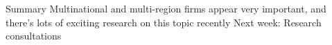 \documentclass[11pt,notes=hide,aspectratio=169]{beamer}
\begin{document}
\begin{frame}{Summary}
Multinational and multi-region firms appear very important, and there's lots of exciting research on this topic recently
\vspace{2cm}
Next week: Research consultations
\end{frame}
\end{document}
